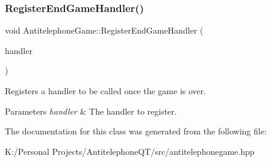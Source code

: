\subsubsection{\texorpdfstring{Register\+End\+Game\+Handler()}{RegisterEndGameHandler()}}
{\footnotesize\ttfamily void Antitelephone\+Game\+::\+Register\+End\+Game\+Handler (\begin{DoxyParamCaption}\item[{\hyperlink{class_antitelephone_game_a9b790d05b5201d728aa47dd6001f5786}{End\+Game\+Handler}}]{handler }\end{DoxyParamCaption})}



Registers a handler to be called once the game is over. 


\begin{DoxyParams}{Parameters}
{\em handler} & The handler to register. \\
\hline
\end{DoxyParams}


The documentation for this class was generated from the following file\+:\begin{DoxyCompactItemize}
\item 
K\+:/\+Personal Projects/\+Antitelephone\+Q\+T/src/antitelephonegame.\+hpp\end{DoxyCompactItemize}
